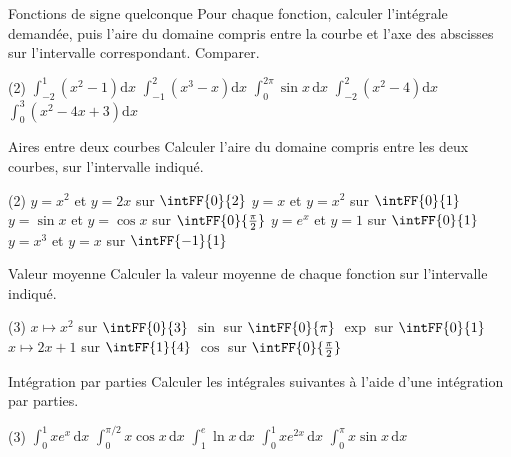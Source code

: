 \begin{exercice}[2]{Fonctions de signe quelconque}
Pour chaque fonction, calculer l'intégrale demandée, puis l'aire du domaine compris entre la courbe et l'axe des abscisses
sur l'intervalle correspondant. Comparer.
\begin{tasks}(2)
  \task $\displaystyle\int_{-2}^1\left(x^{2}-1\right)\mathrm{d}x$
  \task $\displaystyle\int_{-1}^2\left(x^{3}-x\right)\mathrm{d}x$
  \task $\displaystyle\int_0^{2\pi}\sin x\,\mathrm{d}x$
  \task $\displaystyle\int_{-2}^2\left(x^{2}-4\right)\mathrm{d}x$
  \task $\displaystyle\int_0^3\left(x^{2}-4x+3\right)\mathrm{d}x$
\end{tasks}
\end{exercice}

\begin{exercice}[2]{Aires entre deux courbes}
Calculer l'aire du domaine compris entre les deux courbes, sur l'intervalle indiqué.
\begin{tasks}(2)
  \task $y=x^{2}$ et $y=2x$ sur $\intFF{0}{2}$
  \task $y=x$ et $y=x^{2}$ sur $\intFF{0}{1}$
  \task $y=\sin x$ et $y=\cos x$ sur $\intFF{0}{\frac{\pi}{2}}$
  \task $y=e^{x}$ et $y=1$ sur $\intFF{0}{1}$
  \task $y=x^{3}$ et $y=x$ sur $\intFF{-1}{1}$
\end{tasks}
\end{exercice}

\begin{exercice}[2]{Valeur moyenne}
Calculer la valeur moyenne de chaque fonction sur l'intervalle indiqué.
\begin{tasks}(3)
  \task $x\mapsto x^{2}$ sur $\intFF{0}{3}$
  \task $\sin$ sur $\intFF{0}{\pi}$
  \task $\exp$ sur $\intFF{0}{1}$
  \task $x\mapsto2x+1$ sur $\intFF{1}{4}$
  \task $\cos$ sur $\intFF{0}{\frac{\pi}{2}}$
\end{tasks}
\end{exercice}

\begin{exercice}[2]{Intégration par parties}
Calculer les intégrales suivantes à l'aide d'une intégration par parties.
\begin{tasks}(3)
  \task $\displaystyle\int_0^1xe^{x}\,\mathrm{d}x$
  \task $\displaystyle\int_0^{\pi/2}x\cos x\,\mathrm{d}x$
  \task $\displaystyle\int_1^e\ln x\,\mathrm{d}x$
  \task $\displaystyle\int_0^1xe^{2x}\,\mathrm{d}x$
  \task $\displaystyle\int_0^{\pi}x\sin x\,\mathrm{d}x$
\end{tasks}
\end{exercice}


